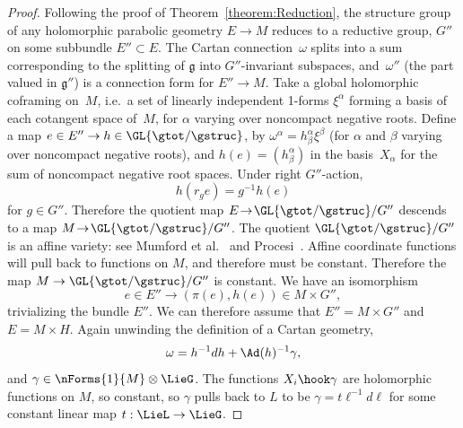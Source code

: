 \begin{proof}
Following the proof of Theorem~\ref{theorem:Reduction}, the structure group of any
holomorphic parabolic geometry $E \to M$ reduces to a reductive group, $G''$
on some subbundle $E'' \subset E$. The Cartan connection~$\omega$ splits into a sum corresponding to the splitting
of $\mathfrak{g}$ into $G''$-invariant subspaces,
and~$\omega''$ (the part valued in $\mathfrak{g}''$)
is a connection form for $E'' \to M$. Take a global
holomorphic coframing on~$M$, i.e.\ a set of linearly independent 1-forms
$\xi^{\alpha}$ forming a basis of each cotangent space of~$M$, for
$\alpha$ varying over noncompact negative roots.
Def\/ine a map $e \in E'' \to h
\in \GL{\gtot/\gstruc}$, by $\omega^{\alpha}=h^{\alpha}_{\beta}
\xi^{\beta}$ (for $\alpha$ and $\beta$ varying over
noncompact negative roots),
and $h(e) =  (h^{\alpha}_{\beta} )$ in the basis~$X_{\alpha}$ for the sum of noncompact negative
root spaces. Under right
$G''$-action,
\[
h\left(r_{g}e\right)=g^{-1}h(e)
\]
for $g \in G''.$ Therefore the quotient map $E \!\to\! \GL{\gtot/\gstruc}/G''$
descends to a map $M \!\to\! \GL{\gtot/\gstruc}/G''$.
The quotient $\GL{\gtot/\gstruc}/G''$ is an af\/f\/ine variety:
see Mumford et al.~\cite[Theorem~1.1, p.~27]{Mumford/Fogarty/Kirwan:1994}
and Procesi~\cite[Theorem~2, p.~556]{Procesi:2007}.
Af\/f\/ine coordinate functions will pull back to functions on $M$,
and therefore must be constant.
Therefore the map $M \to \GL{\gtot/\gstruc}/G''$ is constant.
We have an isomorphism
\[
e \in E'' \to \left(\pi(e),h(e)\right) \in M \times G'',
\]
trivializing the bundle $E''$. We can therefore assume
that $E'' = M \times G''$ and $E = M \times H$.
Again unwinding the def\/inition of a Cartan
geometry,
\[
\omega = h^{-1}   dh + \Ad(h)^{-1}\gamma,
\]
and $\gamma \in \nForms{1}{M} \otimes \LieG$.
The functions $X_i \hook \gamma$
are holomorphic functions on $M$,
so constant, so $\gamma$ pulls back to $L$ to be
$\gamma=t \ell^{-1}   d\ell$ for some constant
linear map $t : \LieL \to \LieG$.
\end{proof}
